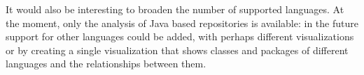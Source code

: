 \documentclass[]{usiinfbachelorproject}
\begin{document}
It would also be interesting to broaden the number of supported languages. At the moment, only the analysis of Java based repositories is available: in the future support for other languages could be added, with perhaps different visualizations or by creating a single visualization that shows classes and packages of different languages and the relationships between them.


%
%
%
%
%
%
\end{document}
